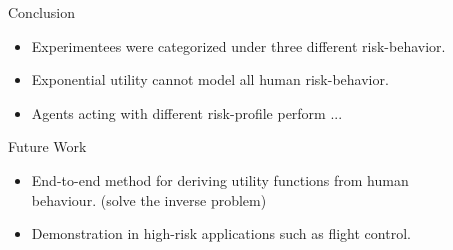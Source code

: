\documentclass[final]{beamer}
\newlength{\sepwid}
\newlength{\onecolwid}
\begin{document}
\begin{frame}
\begin{columns}[t]
\begin{column}{\onecolwid}
\end{column} %

\begin{column}{\sepwid}\end{column} %

\begin{column}{\onecolwid} %









\begin{exampleblock}{Conclusion}

\begin{itemize}
    \item Experimentees were categorized under three different risk-behavior.
    \item Exponential utility cannot model all human risk-behavior.
    \item Agents acting with different risk-profile perform ... 
\end{itemize}

\end{exampleblock}

\begin{exampleblock}{Future Work}

\begin{itemize}
    \item End-to-end method for deriving utility functions from human behaviour. (solve the inverse problem)
    \item Demonstration in high-risk applications such as flight control.
\end{itemize}


\end{exampleblock}
\end{column}
\end{columns}
\end{frame}
\end{document}
